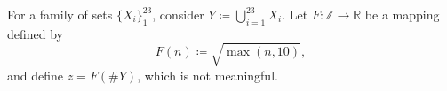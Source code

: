 \documentclass[varwidth=8cm]{standalone}
\begin{document}
For a family of sets $\{X_i\}_1^{23}$, consider $Y \coloneqq \bigcup_{i=1}^{23} X_i$.
Let $F\colon \mathbb{Z} \to \mathbb{R}$ be a mapping defined by
\begin{equation}
    F(n) \coloneqq \sqrt{ \max( n, 10 ) },
\end{equation}
and define $z=F(\# Y)$, which is not meaningful.
\end{document}
